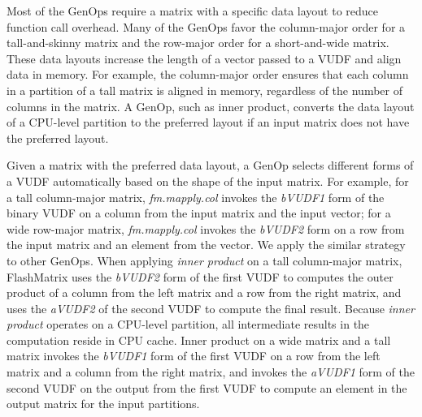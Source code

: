 Most of the GenOps require a matrix with a specific data layout to reduce
function call overhead.
Many of the GenOps favor the column-major order for a tall-and-skinny matrix
and the row-major order for a short-and-wide matrix. These data layouts increase
the length of a vector passed to a VUDF and align data in memory. For example,
the column-major order ensures that each column in a partition of a tall matrix
is aligned in memory, regardless of the number of columns in the matrix. A GenOp,
such as inner product, converts the data layout of a CPU-level partition to
the preferred layout if an input matrix does not have the preferred layout.

Given a matrix with the preferred data layout, a GenOp selects different forms
of a VUDF automatically based on the shape of the input matrix. For example,
for a tall column-major matrix, \textit{fm.mapply.col} invokes the \textit{bVUDF1}
form of the binary VUDF on a column from the input matrix and the input vector;
for a wide row-major matrix, \textit{fm.mapply.col} invokes the \textit{bVUDF2}
form on a row from the input matrix and an element from the vector. We apply
the similar strategy to other GenOps. When applying \textit{inner product}
on a tall column-major matrix, FlashMatrix uses the \textit{bVUDF2} form of
the first VUDF to computes the outer product of a column from the left matrix
and a row from the right matrix, and uses the \textit{aVUDF2} of the second VUDF
to compute the final result. Because \textit{inner product} operates on
a CPU-level partition, all intermediate results in the computation reside
in CPU cache. Inner product on a wide matrix and a tall matrix invokes the
\textit{bVUDF1} form of the first VUDF on a row from the left matrix and a column
from the right matrix, and invokes the \textit{aVUDF1} form of the second VUDF
on the output from the first VUDF to compute an element in the output matrix for
the input partitions.


